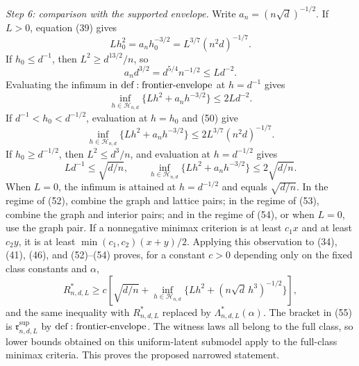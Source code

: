 \textit{Step 6: comparison with the supported envelope.}
Write \(a_n=(n\sqrt d)^{-1/2}\).  If \(L>0\), equation (39) gives
\[
 Lh_0^2=a_nh_0^{-3/2}=L^{3/7}(n^2d)^{-1/7}.
\tag{50}
\]
If \(h_0\leq d^{-1}\), then \(L^2\geq d^{13/2}/n\), so
\[
 a_nd^{3/2}=d^{5/4}n^{-1/2}\leq Ld^{-2}.
\tag{51}
\]
Evaluating the infimum in \({\rm def:frontier\text{-}envelope}\) at \(h=d^{-1}\) gives
\[
 \inf_{h\in\mathcal H_{n,d}}\{Lh^2+a_nh^{-3/2}\}
 \leq2Ld^{-2}.
\tag{52}
\]
If \(d^{-1}<h_0<d^{-1/2}\), evaluation at \(h=h_0\) and (50) give
\[
 \inf_{h\in\mathcal H_{n,d}}\{Lh^2+a_nh^{-3/2}\}
 \leq2L^{3/7}(n^2d)^{-1/7}.
\tag{53}
\]
If \(h_0\geq d^{-1/2}\), then \(L^2\leq d^3/n\), and evaluation at \(h=d^{-1/2}\) gives
\[
 Ld^{-1}\leq\sqrt{d/n},
 \qquad
 \inf_{h\in\mathcal H_{n,d}}\{Lh^2+a_nh^{-3/2}\}
 \leq2\sqrt{d/n}.
\tag{54}
\]
When \(L=0\), the infimum is attained at \(h=d^{-1/2}\) and equals \(\sqrt{d/n}\).  In the regime of (52), combine the graph and lattice pairs; in the regime of (53), combine the graph and interior pairs; and in the regime of (54), or when \(L=0\), use the graph pair.  If a nonnegative minimax criterion is at least \(c_1x\) and at least \(c_2y\), it is at least \(\min(c_1,c_2)(x+y)/2\).  Applying this observation to (34), (41), (46), and (52)--(54) proves, for a constant \(c>0\) depending only on the fixed class constants and \(\alpha\),
\[
 R^*_{n,d,L}\geq c\left[\sqrt{d/n}+
 \inf_{h\in\mathcal H_{n,d}}\{Lh^2+(n\sqrt d\,h^3)^{-1/2}\}\right],
\tag{55}
\]
and the same inequality with \(R^*_{n,d,L}\) replaced by \(\Lambda^*_{n,d,L}(\alpha)\).  The bracket in (55) is \(\mathfrak r^{\mathrm{sup}}_{n,d,L}\) by \({\rm def:frontier\text{-}envelope}\).  The witness laws all belong to the full class, so lower bounds obtained on this uniform-latent submodel apply to the full-class minimax criteria.  This proves the proposed narrowed statement.